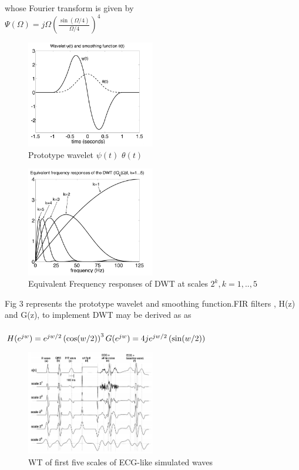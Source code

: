 \documentclass[twocolumn,showpacs,%
  nofootinbib,aps,superscriptaddress,%
  eqsecnum,prd,notitlepage,showkeys,10pt]{revtex4-1}
\begin{document}
\\ \\ 
whose Fourier transform is given by \\
\begin{math}
\Psi (\Omega) = j \Omega \left ( \frac{\sin(\Omega/4)}{\Omega/4} \right ) ^ 4
\end{math}
\\
\begin{figure}
\includegraphics[width=0.5\textwidth]{fig3.png}
\caption{\label{fig:fig3} Prototype wavelet \( \psi (t) \) \(\theta (t) \) }
\end{figure} 
\begin{figure}
\includegraphics[width=0.5\textwidth]{fig4.png}
\caption{\label{fig:Fig4} Equivalent Frequency responses of DWT at scales \(2^k , k = 1, .., 5 \)   }
\end{figure}
Fig 3 represents the prototype wavelet and smoothing function.FIR filters , H(z) and G(z), to implement DWT may be derived as as 
\\ \\
\begin{math}
H(e^{jw}) =  e^{jw/2} \left ( \cos (w/2)\right ) ^3 \\
G(e^{jw}) =  4je^{jw/2} \left( \sin(w/2) \right )
\end{math}
\begin{figure}
\includegraphics[width=0.5\textwidth]{fig5.png}
\caption{\label{fig:Fig5} WT of first five scales of ECG-like simulated waves   }
\end{figure}
\end{document}
